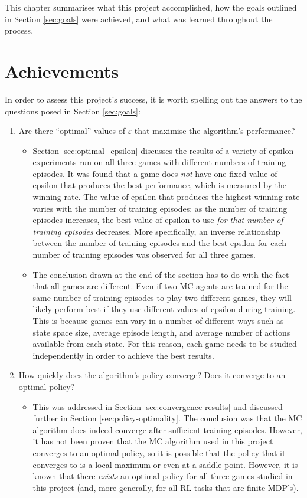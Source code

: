 \documentclass[11pt,a4paper]{report}
\begin{document}
This chapter summarises what this project accomplished, how the goals outlined in Section \ref{sec:goals} were achieved, and what was learned throughout the process.


\section{Achievements}

In order to assess this project's success, it is worth spelling out the answers to the questions posed in Section \ref{sec:goals}: 

\begin{enumerate}
	\item Are there ``optimal'' values of $\varepsilon$ that maximise the algorithm's performance?
	\begin{itemize}
	    \item 
Section \ref{sec:optimal_epsilon} discusses the results of a variety of epsilon experiments run on all three games with different numbers of training episodes. It was found that a game does \emph{not} have one fixed value of epsilon that produces the best performance, which is measured by the winning rate. The value of epsilon that produces the highest winning rate varies with the number of training episodes: as the number of training episodes increases, the best value of epsilon to use \emph{for that number of training episodes} decreases. More specifically, an inverse relationship between the number of training episodes and the best epsilon for each number of training episodes was observed for all three games.
        \item
The conclusion drawn at the end of the section has to do with the fact that all games are different. Even if two MC agents are trained for the same number of training episodes to play two different games, they will likely perform best if they use different values of epsilon during training. This is because games can vary in a number of different ways such as state space size, average episode length, and average number of actions available from each state. For this reason, each game needs to be studied independently in order to achieve the best results.
	\end{itemize}
	
	\item How quickly does the algorithm's policy converge? Does it converge to an optimal policy?
	\begin{itemize}
	    \item 
This was addressed in Section \ref{sec:convergence-results} and discussed further in Section \ref{sec:policy-optimality}. The conclusion was that the MC algorithm does indeed converge after sufficient training episodes. However, it has not been proven that the MC algorithm used in this project converges to an optimal policy, so it is possible that the policy that it converges to is a local maximum or even at a saddle point. However, it is known that there \emph{exists} an optimal policy for all three games studied in this project (and, more generally, for all RL tasks that are finite MDP's).
	\end{itemize}
	

\end{enumerate}
\end{document}
